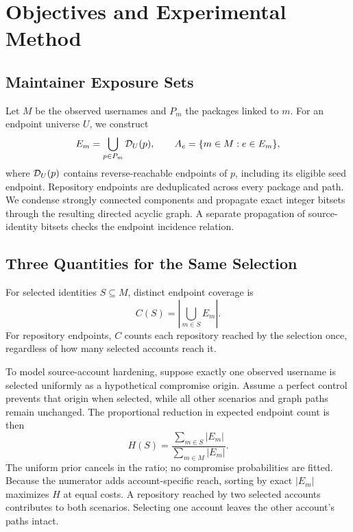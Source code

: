 \section{Objectives and Experimental Method}
\subsection{Maintainer Exposure Sets}
Let $M$ be the observed usernames and $P_m$ the packages linked to $m$. For an endpoint universe $U$, we construct
\begin{equation}
 E_m=\bigcup_{p\in P_m}\mathcal{D}_U(p),\qquad
 A_e=\{m\in M:e\in E_m\},
\end{equation}
where $\mathcal{D}_U(p)$ contains reverse-reachable endpoints of $p$, including its eligible seed endpoint. Repository endpoints are deduplicated across every package and path. We condense strongly connected components and propagate exact integer bitsets through the resulting directed acyclic graph. A separate propagation of source-identity bitsets checks the endpoint incidence relation.

\subsection{Three Quantities for the Same Selection}
For selected identities $S\subseteq M$, distinct endpoint coverage is
\begin{equation}
 C(S)=\left|\bigcup_{m\in S}E_m\right|.
\end{equation}
For repository endpoints, $C$ counts each repository reached by the selection once, regardless of how many selected accounts reach it.

To model source-account hardening, suppose exactly one observed username is selected uniformly as a hypothetical compromise origin. Assume a perfect control prevents that origin when selected, while all other scenarios and graph paths remain unchanged. The proportional reduction in expected endpoint count is then
\begin{equation}
 H(S)=\frac{\sum_{m\in S}|E_m|}{\sum_{m\in M}|E_m|}.
 \label{eq:exposure}
\end{equation}
The uniform prior cancels in the ratio; no compromise probabilities are fitted. Because the numerator adds account-specific reach, sorting by exact $|E_m|$ maximizes $H$ at equal costs. A repository reached by two selected accounts contributes to both scenarios. Selecting one account leaves the other account's paths intact.

